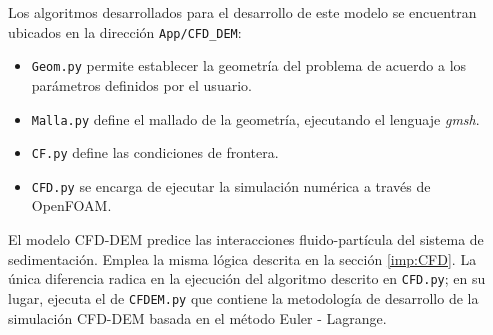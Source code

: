 \noindent
\justify

Los algoritmos desarrollados para el desarrollo de este modelo se encuentran ubicados en la direcci\'on \texttt{App/{CFD\_DEM}}:

\begin{itemize}
	\item \texttt{Geom.py} permite establecer la geometr\'ia del problema de acuerdo a los par\'ametros definidos por el usuario.
	\item \texttt{Malla.py} define el mallado de la geometr\'ia, ejecutando el lenguaje \textit{gmsh}.
	\item \texttt{CF.py} define las condiciones de frontera.
	\item \texttt{CFD.py} se encarga de ejecutar la simulaci\'on num\'erica a trav\'es de OpenFOAM.
\end{itemize}

\noindent
\justify

El modelo CFD-DEM predice las interacciones fluido-part\'icula del sistema de sedimentaci\'on. Emplea la misma l\'ogica descrita en la secci\'on \ref{imp:CFD}. La \'unica diferencia radica en la ejecuci\'on del algoritmo descrito en \texttt{CFD.py}; en su lugar, ejecuta el de \texttt{CFDEM.py} que contiene la metodolog\'ia de desarrollo de la simulaci\'on CFD-DEM basada en el m\'etodo Euler - Lagrange.

